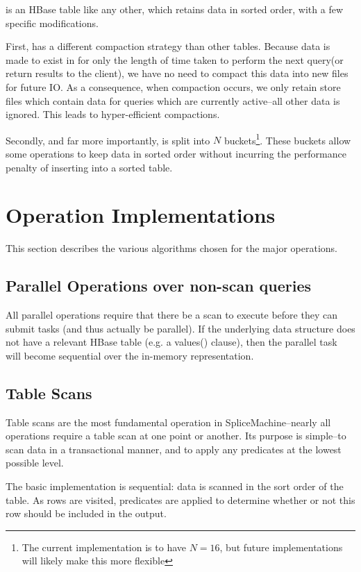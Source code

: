 \temp is an HBase table like any other, which retains data in sorted order, with a few specific modifications.

First, \temp has a different compaction strategy than other tables. Because data is made to exist in \temp for only the length of time taken to perform the next query(or return results to the client), we have no need to compact this data into new files for future IO. As a consequence, when compaction occurs, we only retain store files which contain data for queries which are currently active--all other data is ignored. This leads to hyper-efficient compactions.

Secondly, and far more importantly, \temp is split into $N$ buckets\footnote{The current implementation is to have $N=16$, but future implementations will likely make this more flexible}. These buckets allow some operations to keep data in sorted order without incurring the performance penalty of inserting into a sorted table.

\section{Operation Implementations}
This section describes the various algorithms chosen for the major operations.

\subsection{Parallel Operations over non-scan queries}
All parallel operations require that there be a scan to execute before they can submit tasks (and thus actually be parallel). If the underlying data structure does not have a relevant HBase table (e.g. a values() clause), then the parallel task will become sequential over the in-memory representation.

\subsection{Table Scans}
Table scans are the most fundamental operation in SpliceMachine--nearly all operations require a table scan at one point or another. Its purpose is simple--to scan data in a transactional manner, and to apply any predicates at the lowest possible level.

The basic implementation is sequential: data is scanned in the sort order of the table. As rows are visited, predicates are applied to determine whether or not this row should be included in the output.

